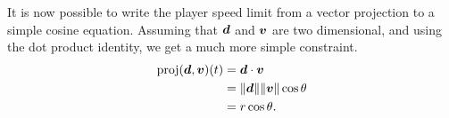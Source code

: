 %
It is now possible to write the player speed limit from a vector projection to a simple cosine equation. Assuming that $\boldsymbol{d}$ and $\boldsymbol{v}$ are two dimensional, and using the dot product identity, we get a much more simple constraint.
\begin{align*}
    \text{proj}(\boldsymbol{d}, \boldsymbol{v})(t) &= \boldsymbol{d} \cdot \boldsymbol{v}\\
    &= \|\boldsymbol{d}\| \|\boldsymbol{v}\| \cos \theta\\
    &= r \cos \theta.
\end{align*}



